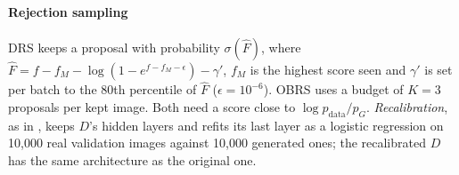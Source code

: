 \paragraph{Rejection sampling}
DRS \cite{azadi2019} keeps a proposal with probability $\sigma(\hat F)$, where $\hat F = f - f_M - \log(1-e^{f-f_M-\epsilon}) - \gamma'$, $f_M$ is the highest score seen and $\gamma'$ is set per batch to the 80th percentile of $\hat F$ ($\epsilon=10^{-6}$). OBRS \cite{verine2024} uses a budget of $K=3$ proposals per kept image. Both need a score close to $\log p_\mathrm{data}/p_G$. \emph{Recalibration}, as in \cite{azadi2019}, keeps $D$'s hidden layers and refits its last layer as a logistic regression on 10,000 real validation images against 10,000 generated ones; the recalibrated $D$ has the same architecture as the original one.
